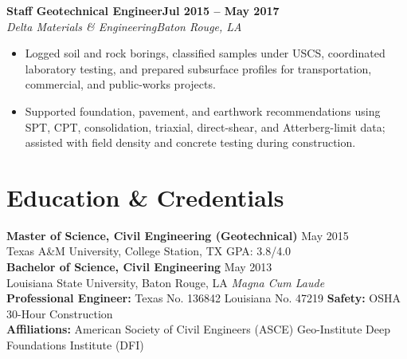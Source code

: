 \documentclass[10pt,letterpaper]{article}
\newcommand{\resumeRole}[4]{%
  \textbf{#1}\hfill\textbf{#2}\\[-0.15em]
  \textit{#3}\hfill\textit{#4}\vspace{-0.25em}
}
\begin{document}
\resumeRole{Staff Geotechnical Engineer}{Jul 2015 -- May 2017}{Delta Materials \& Engineering}{Baton Rouge, LA}
\begin{itemize}
  \item Logged soil and rock borings, classified samples under USCS, coordinated laboratory testing, and prepared subsurface profiles for transportation, commercial, and public-works projects.
  \item Supported foundation, pavement, and earthwork recommendations using SPT, CPT, consolidation, triaxial, direct-shear, and Atterberg-limit data; assisted with field density and concrete testing during construction.
\end{itemize}

\section*{Education \& Credentials}
\textbf{Master of Science, Civil Engineering (Geotechnical)} \hfill May 2015\\[-0.15em]
Texas A\&M University, College Station, TX \hfill GPA: 3.8/4.0\\[0.28em]
\textbf{Bachelor of Science, Civil Engineering} \hfill May 2013\\[-0.15em]
Louisiana State University, Baton Rouge, LA \hfill \textit{Magna Cum Laude}\\[0.28em]
\textbf{Professional Engineer:} Texas No. 136842 \enspace\textbar\enspace Louisiana No. 47219
\enspace\textbar\enspace \textbf{Safety:} OSHA 30-Hour Construction\\[0.2em]
\textbf{Affiliations:} American Society of Civil Engineers (ASCE) \enspace\textbar\enspace Geo-Institute \enspace\textbar\enspace Deep Foundations Institute (DFI)
\end{document}
